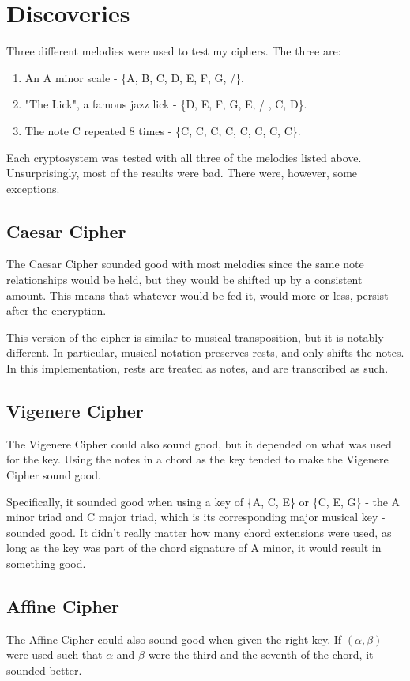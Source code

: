 \documentclass[14pt]{article}
\begin{document}
	\section{Discoveries}
        Three different melodies were used to test my ciphers. The three are:
        \begin{enumerate}
            \item An A minor scale - \{A, B, C, D, E, F, G, /\}.
            \item "The Lick", a famous jazz lick - \{D, E, F, G, E, / , C, D\}.
            \item The note C repeated 8 times - \{C, C, C, C, C, C, C, C\}.
        \end{enumerate}

        Each cryptosystem was tested with all three of the melodies listed above. Unsurprisingly, most of the results were bad. There were, however, some exceptions.

        \subsection{Caesar Cipher}
        The Caesar Cipher sounded good with most melodies since the same note relationships would be held, but they would be shifted up by a consistent amount. This means that whatever would be fed it, would more or less, persist after the encryption.

        This version of the cipher is similar to musical transposition, but it is notably different. In particular, musical notation preserves rests, and only shifts the notes. In this implementation, rests are treated as notes, and are transcribed as such.

        \subsection{Vigenere Cipher}
        The Vigenere Cipher could also sound good, but it depended on what was used for the key. Using the notes in a chord as the key tended to make the Vigenere Cipher sound good.

        Specifically, it sounded good when using a key of \{A, C, E\} or \{C, E, G\} - the A minor triad and C major triad, which is its corresponding major musical key - sounded good. It didn't really matter how many chord extensions were used, as long as the key was part of the chord signature of A minor, it would result in something good.

        \subsection{Affine Cipher}
        The Affine Cipher could also sound good when given the right key. If $(\alpha, \beta)$ were used such that $\alpha$ and $\beta$ were the third and the seventh of the chord, it sounded better.
\end{document}
